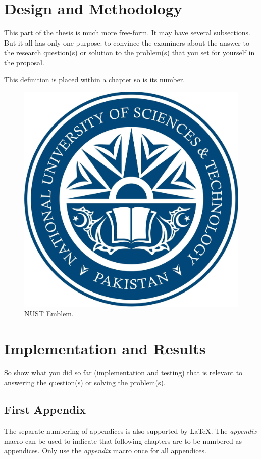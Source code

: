 \documentclass[11pt,a4paper,oneside]{book} %
\numberwithin{equation}{section}
\begin{document}
\chapter{Design and Methodology}
\label{c-methods}

This part of the thesis is much more free-form. It may have several subsections. But it all has only one purpose: to convince the examiners about the answer to the research question(s) or solution to the problem(s) that you set for yourself in the proposal.

\begin{definition}[Testing 1,2,3]
This definition is placed within a chapter so is its number.
\end{definition}

\begin{figure}[htp]
\begin{center}
  \includegraphics[width=0.7\columnwidth]{nust.jpg}
  \caption{NUST Emblem.}
  \label{f-nust}
\end{center}
\end{figure}


\chapter{Implementation and Results}
\label{c-results}

So show what you did so far (implementation and testing) that is relevant to
answering the question(s) or solving the problem(s).





% 
%
\printbibliography

\begin{appendix}
\chapter{First Appendix}
The separate numbering of appendices is also supported by LaTeX. The \textit{appendix} macro can be used to indicate that following chapters are to be numbered as appendices. Only use the \textit{appendix} macro once for all appendices.
\end{appendix}



\end{document}
